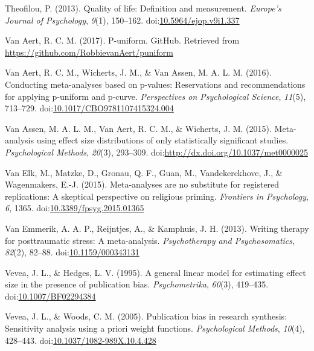 \documentclass[man]{apa6}
\theoremstyle{definition}
\theoremstyle{definition}
\theoremstyle{definition}
\theoremstyle{remark}
\begin{document}
\hypertarget{ref-Theofilou2013}{}
Theofilou, P. (2013). Quality of life: Definition and measurement.
\emph{Europe's Journal of Psychology}, \emph{9}(1), 150--162.
doi:\href{https://doi.org/10.5964/ejop.v9i1.337}{10.5964/ejop.v9i1.337}

\hypertarget{ref-VanAert2017}{}
Van Aert, R. C. M. (2017). P-uniform. GitHub. Retrieved from
\url{https://github.com/RobbievanAert/puniform}

\hypertarget{ref-VanAert2016}{}
Van Aert, R. C. M., Wicherts, J. M., \& Van Assen, M. A. L. M. (2016).
Conducting meta-analyses based on p-values: Reservations and
recommendations for applying p-uniform and p-curve. \emph{Perspectives
on Psychological Science}, \emph{11}(5), 713--729.
doi:\href{https://doi.org/10.1017/CBO9781107415324.004}{10.1017/CBO9781107415324.004}

\hypertarget{ref-VanAssen2015}{}
Van Assen, M. A. L. M., Van Aert, R. C. M., \& Wicherts, J. M. (2015).
Meta-analysis using effect size distributions of only statistically
significant studies. \emph{Psychological Methods}, \emph{20}(3),
293--309.
doi:\href{https://doi.org/http://dx.doi.org/10.1037/met0000025}{http://dx.doi.org/10.1037/met0000025}

\hypertarget{ref-VanElk2015}{}
Van Elk, M., Matzke, D., Gronau, Q. F., Guan, M., Vandekerckhove, J., \&
Wagenmakers, E.-J. (2015). Meta-analyses are no substitute for
registered replications: A skeptical perspective on religious priming.
\emph{Frontiers in Psychology}, \emph{6}, 1365.
doi:\href{https://doi.org/10.3389/fpsyg.2015.01365}{10.3389/fpsyg.2015.01365}

\hypertarget{ref-VanEmmerik2013}{}
Van Emmerik, A. A. P., Reijntjes, A., \& Kamphuis, J. H. (2013). Writing
therapy for posttraumatic stress: A meta-analysis. \emph{Psychotherapy
and Psychosomatics}, \emph{82}(2), 82--88.
doi:\href{https://doi.org/10.1159/000343131}{10.1159/000343131}

\hypertarget{ref-Vevea1995}{}
Vevea, J. L., \& Hedges, L. V. (1995). A general linear model for
estimating effect size in the presence of publication bias.
\emph{Psychometrika}, \emph{60}(3), 419--435.
doi:\href{https://doi.org/10.1007/BF02294384}{10.1007/BF02294384}

\hypertarget{ref-Vevea2005}{}
Vevea, J. L., \& Woods, C. M. (2005). Publication bias in research
synthesis: Sensitivity analysis using a priori weight functions.
\emph{Psychological Methods}, \emph{10}(4), 428--443.
doi:\href{https://doi.org/10.1037/1082-989X.10.4.428}{10.1037/1082-989X.10.4.428}
\end{document}

